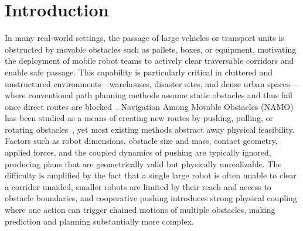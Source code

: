 \section{Introduction}\label{sec:intro}
In many real-world settings, the passage of large vehicles or transport units is
obstructed by movable obstacles such as pallets, boxes, or equipment, motivating
the deployment of mobile robot teams to actively clear traversable corridors and
enable safe passage. This capability is particularly critical in cluttered and
unstructured environments—warehouses, disaster sites, and dense urban spaces—
where conventional path planning methods assume static obstacles and thus fail
once direct routes are blocked~\cite{liu2023path}. Navigation Among Movable
Obstacles (NAMO) has been studied as a means of creating new routes by pushing,
pulling, or rotating obstacles~\cite{stilman2005navigation}, yet most existing
methods abstract away physical feasibility. Factors such as robot dimensions,
obstacle size and mass, contact geometry, applied forces, and the coupled
dynamics of pushing are typically ignored, producing plans that are geometrically
valid but physically unrealizable. The difficulty is amplified by the fact that
a single large robot is often unable to clear a corridor unaided, smaller robots
are limited by their reach and access to obstacle boundaries, and cooperative
pushing introduces strong physical coupling where one action can trigger chained
motions of multiple obstacles, making prediction and planning substantially more
complex.




